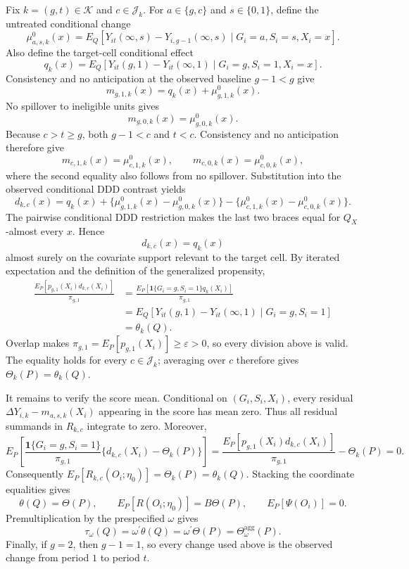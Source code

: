Fix \(k=(g,t)\in\mathcal K\) and \(c\in\mathcal J_k\). For \(a\in\{g,c\}\) and \(s\in\{0,1\}\), define the untreated conditional change
\[
 \mu^0_{a,s,k}(x)
 =E_Q\!\left[Y_{it}(\infty,s)-Y_{i,g-1}(\infty,s)
       \mid G_i=a,S_i=s,X_i=x\right].
\]
Also define the target-cell conditional effect
\[
 q_k(x)=E_Q\!\left[Y_{it}(g,1)-Y_{it}(\infty,1)
       \mid G_i=g,S_i=1,X_i=x\right].
\]
Consistency and no anticipation at the observed baseline \(g-1<g\) give
\[
 m_{g,1,k}(x)=q_k(x)+\mu^0_{g,1,k}(x).
\]
No spillover to ineligible units gives
\[
 m_{g,0,k}(x)=\mu^0_{g,0,k}(x).
\]
Because \(c>t\ge g\), both \(g-1<c\) and \(t<c\). Consistency and no anticipation therefore give
\[
 m_{c,1,k}(x)=\mu^0_{c,1,k}(x),
 \qquad
 m_{c,0,k}(x)=\mu^0_{c,0,k}(x),
\]
where the second equality also follows from no spillover. Substitution into the observed conditional DDD contrast yields
\[
 d_{k,c}(x)=q_k(x)
 +\{\mu^0_{g,1,k}(x)-\mu^0_{g,0,k}(x)\}
 -\{\mu^0_{c,1,k}(x)-\mu^0_{c,0,k}(x)\}.
\]
The pairwise conditional DDD restriction makes the last two braces equal for \(Q_X\)-almost every \(x\). Hence
\[
 d_{k,c}(x)=q_k(x)
\]
almost surely on the covariate support relevant to the target cell. By iterated expectation and the definition of the generalized propensity,
\[
\begin{aligned}
 \frac{E_P[p_{g,1}(X_i)d_{k,c}(X_i)]}{\pi_{g,1}}
 &=\frac{E_P[\mathbf 1\{G_i=g,S_i=1\}q_k(X_i)]}{\pi_{g,1}}\\
 &=E_Q[Y_{it}(g,1)-Y_{it}(\infty,1)\mid G_i=g,S_i=1]\\
 &=\theta_k(Q).
\end{aligned}
\]
Overlap makes \(\pi_{g,1}=E_P[p_{g,1}(X_i)]\ge\varepsilon>0\), so every division above is valid. The equality holds for every \(c\in\mathcal J_k\); averaging over \(c\) therefore gives \(\Theta_k(P)=\theta_k(Q)\).

It remains to verify the score mean. Conditional on \((G_i,S_i,X_i)\), every residual \(\Delta Y_{i,k}-m_{a,s,k}(X_i)\) appearing in the score has mean zero. Thus all residual summands in \(R_{k,c}\) integrate to zero. Moreover,
\[
 E_P\!\left[\frac{\mathbf 1\{G_i=g,S_i=1\}}{\pi_{g,1}}
 \{d_{k,c}(X_i)-\Theta_k(P)\}\right]
 =\frac{E_P[p_{g,1}(X_i)d_{k,c}(X_i)]}{\pi_{g,1}}-\Theta_k(P)=0.
\]
Consequently \(E_P[R_{k,c}(O_i;\eta_0)]=\Theta_k(P)=\theta_k(Q)\). Stacking the coordinate equalities gives
\[
 \theta(Q)=\Theta(P),\qquad
 E_P[R(O_i;\eta_0)]=B\Theta(P),\qquad
 E_P[\Psi(O_i)]=0.
\]
Premultiplication by the prespecified \(\omega\) gives
\[
 \tau_\omega(Q)=\omega^{\prime}\theta(Q)
 =\omega^{\prime}\Theta(P)=\Theta_\omega^{\mathrm{agg}}(P).
\]
Finally, if \(g=2\), then \(g-1=1\), so every change used above is the observed change from period \(1\) to period \(t\).